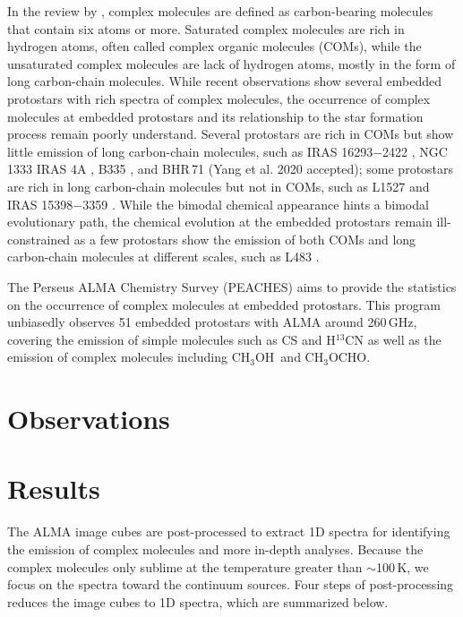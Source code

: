 \documentclass[twocolumn]{aastex62}
\newcommand{\methylformate}{\mbox{CH$_{3}$OCHO}}
\newcommand{\methanol}{\mbox{CH$_{3}$OH}}
\begin{document}
In the review by \citet{2009ARA&A..47..427H}, complex molecules are defined as carbon-bearing molecules that contain six atoms or more.  Saturated complex molecules are rich in hydrogen atoms, often called complex organic molecules (COMs), while the unsaturated complex molecules are lack of hydrogen atoms, mostly in the form of long carbon-chain molecules.  While recent observations show several embedded protostars with rich spectra of complex molecules, the occurrence of complex molecules at embedded protostars and its relationship to the star formation process remain poorly understand.  Several protostars are rich in COMs but show little emission of long carbon-chain molecules, such as IRAS 16293$-$2422 \citep{2016A&A...595A.117J}, NGC 1333 IRAS 4A \citep{2004ApJ...615..354B}, B335 \citep{2016ApJ...830L..37I,2019ApJ...873L..21I}, and BHR\,71 (Yang et al. 2020 accepted); some protostars are rich in long carbon-chain molecules but not in COMs, such as L1527 \citep{2010ApJ...722.1633S} and IRAS 15398$-$3359 \citep{2009ApJ...697..769S}.  While the bimodal chemical appearance hints a bimodal evolutionary path, the chemical evolution at the embedded protostars remain ill-constrained as a few protostars show the emission of both COMs and long carbon-chain molecules at different scales, such as L483 \citep{2017ApJ...837..174O}. 

The Perseus ALMA Chemistry Survey (PEACHES) aims to provide the statistics on the occurrence of complex molecules at embedded protostars.  This program unbiasedly observes 51 embedded protostars with ALMA around 260\,GHz, covering the emission of simple molecules such as CS and H$^{13}$CN as well as the emission of complex molecules including \methanol\ and \methylformate.  

\section{Observations}






\section{Results}
The ALMA image cubes are post-processed to extract 1D spectra for identifying the emission of complex molecules and more in-depth analyses.  Because the complex molecules only sublime at the temperature greater than $\sim$100\,K, we focus on the spectra toward the continuum sources.  Four steps of post-processing reduces the image cubes to 1D spectra, which are summarized below.
\end{document}

